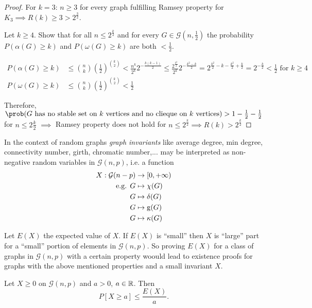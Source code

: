 \documentclass[aagt.tex]{subfiles}
\begin{document}
\begin{proof}
  For $k=3$: $n \geq 3$ for every graph fulfilling Ramsey property for $K_3 \implies R(k) \geq 3 > 2^{\frac{3}{2}}$.
 
  Let $k \geq 4$. Show that for all $n \leq 2^{\frac{k}{2}}$ and for every $G \in \mathcal{G}(n,\frac{1}{2})$ the probability $P(\alpha(G) \geq k)$ and $P(\omega(G) \geq k)$ are both $< \frac{1}{2}$.
  
  \begin{lemma}
    \begin{align*}
      P(\alpha(G) \geq k) &\leq {n \choose k} \left( \frac{1}{2} \right)^{k \choose 2} < \frac{n^k}{2^k} 2^{-\frac{k(k-1)}{2}} \leq \frac{2^{\frac{k^2}{2}}}{2^k} 2^{- \frac{k^2-k}{2}} = 2^{\frac{k^2}{2} - k - \frac{k^2}{2} + \frac{k}{2}} = 2^{-\frac{k}{2}} < \frac{1}{2} \text{ for } k \geq 4 \\
      P(\omega(G) \geq k) &\leq {n \choose k} \left( \frac{1}{2} \right)^{k \choose 2} < \frac{1}{2}
    \end{align*}
  \end{lemma}
  Therefore, $\prob(G \text{ has no stable set on } k \text{ vertices and no clieque on } k \text{ vertices}) > 1 - \frac{1}{2} - \frac{1}{2}$ for $n \leq 2	{\frac{k}{2}}$
  $\implies$ Ramsey property does not hold for $n \leq 2^{\frac{k}{2}} \implies R(k) > 2^{\frac{k}{2}}$
\end{proof}

In the context of random graphs \emph{graph invariants} like average degree, min degree, connectivity number, girth, chromatic number,... may be interpreted as non-negative random variables in $\mathcal{G}(n,p)$, 
i.e. a function 
\begin{align*}
  X: \mathcal{G}(n-p) &\to [0,+\infty) \\
  \text{e.g. } G &\mapsto \chi(G) \\
  G &\mapsto \delta(G) \\
  G &\mapsto \operatorname{g}(G) \\
  G &\mapsto \kappa(G)
\end{align*}

Let $E(X)$ the expected value of $X$.
If $E(X)$ is \enquote{small} then $X$ is \enquote{large} part for a \enquote{small} portion of elements in $\mathcal{G}(n,p)$.
So proving $E(X)$ for a class of graphs in $\mathcal{G}(n,p)$ with a certain property woould lead to existence proofs for graphs with the above mentioned properties and a small invariant $X$.

\begin{lemma}\label{7.6-lemma}
  Let $X \geq 0$ on $\mathcal{G}(n,p)$ and $a > 0$, $a \in \mathbb{R}$. Then
  \[ P[X \geq a] \leq \frac{E(X)}{a} \text{.} \]
\end{lemma}
\end{document}

